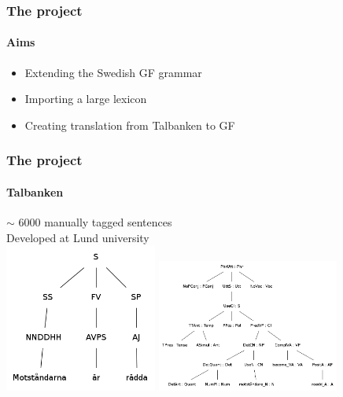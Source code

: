 \documentclass[10pt]{beamer}
\begin{document}
\begin{frame}
\frametitle{The project}
\framesubtitle{Aims} 
\begin{itemize}
\item Extending the Swedish GF grammar
\item Importing a large lexicon
\item Creating translation from Talbanken to GF
\end{itemize}
\end{frame}

\begin{frame}
\frametitle{The project}
\framesubtitle{Talbanken} 
{$\sim$ 6000 manually tagged sentences}\\
Developed at Lund university\\
\pause
\includegraphics[width=50mm]{motstaandTb.png}
\pause
\includegraphics[width=60mm]{motstand.png}

\end{frame}
\end{document}
